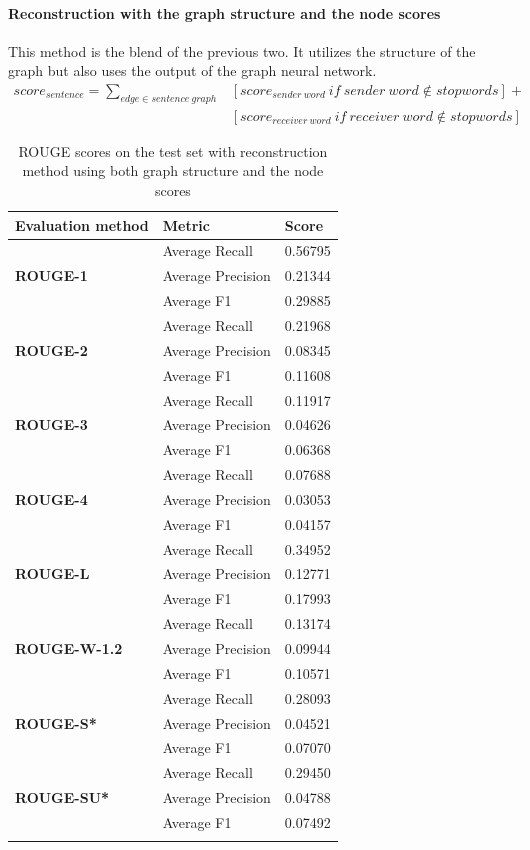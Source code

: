 \paragraph{Reconstruction with the graph structure and the node scores}

This method is the blend of the previous two. It utilizes the structure of the graph but also uses the output of the graph neural network.
\begin{eqnarray*}
	score_{sentence} = \sum_{edge \in sentence\ graph} &[score_{sender\ word}\ if\ sender\ word \notin stopwords] + \\&[score_{receiver\ word}\ if\ receiver\ word \notin stopwords]
\end{eqnarray*}
\begin{longtable}{| l | l | l |}
	\hline
	\textbf{Evaluation method}&\textbf{Metric}&\textbf{Score}\\ \hline \hline		
	\multirow{3}{*}{\textbf{ROUGE-1}}
		&Average Recall&0.56795 \\
		&Average Precision&0.21344 \\
		&Average F1&0.29885 \\ \hline \hline
	\multirow{3}{*}{\textbf{ROUGE-2}}
		&Average Recall&0.21968 \\
		&Average Precision&0.08345 \\
		&Average F1&0.11608 \\ \hline \hline
	\multirow{3}{*}{\textbf{ROUGE-3}}
		&Average Recall&0.11917 \\
		&Average Precision&0.04626 \\
		&Average F1&0.06368 \\ \hline \hline
	\multirow{3}{*}{\textbf{ROUGE-4}}
		&Average Recall&0.07688 \\
		&Average Precision&0.03053 \\
		&Average F1&0.04157 \\ \hline \hline
	\multirow{3}{*}{\textbf{ROUGE-L}}
		&Average Recall&0.34952 \\
		&Average Precision&0.12771 \\
		&Average F1&0.17993 \\ \hline \hline
	\multirow{3}{*}{\textbf{ROUGE-W-1.2}}
		&Average Recall&0.13174 \\
		&Average Precision&0.09944 \\
		&Average F1&0.10571 \\ \hline \hline
	\multirow{3}{*}{\textbf{ROUGE-S*}}
		&Average Recall&0.28093 \\
		&Average Precision&0.04521 \\
		&Average F1&0.07070 \\ \hline \hline
	\multirow{3}{*}{\textbf{ROUGE-SU*}}
		&Average Recall&0.29450 \\
		&Average Precision&0.04788 \\
		&Average F1&0.07492 \\ \hline
	\caption{ROUGE scores on the test set with reconstruction method using both graph structure and the node scores}
\end{longtable}

